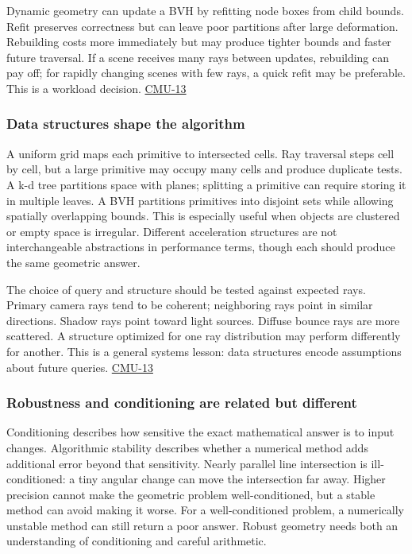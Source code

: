 Dynamic geometry can update a BVH by refitting node boxes from child bounds. Refit preserves correctness but can leave poor partitions after large deformation. Rebuilding costs more immediately but may produce tighter bounds and faster future traversal. If a scene receives many rays between updates, rebuilding can pay off; for rapidly changing scenes with few rays, a quick refit may be preferable. This is a workload decision. \hyperref[04-visual-computing-ii-ch036]{CMU-13}

\subsubsection{Data structures shape the algorithm}\label{data-structures-shape-the-algorithm}

A uniform grid maps each primitive to intersected cells. Ray traversal steps cell by cell, but a large primitive may occupy many cells and produce duplicate tests. A k-d tree partitions space with planes; splitting a primitive can require storing it in multiple leaves. A BVH partitions primitives into disjoint sets while allowing spatially overlapping bounds. This is especially useful when objects are clustered or empty space is irregular. Different acceleration structures are not interchangeable abstractions in performance terms, though each should produce the same geometric answer.

The choice of query and structure should be tested against expected rays. Primary camera rays tend to be coherent; neighboring rays point in similar directions. Shadow rays point toward light sources. Diffuse bounce rays are more scattered. A structure optimized for one ray distribution may perform differently for another. This is a general systems lesson: data structures encode assumptions about future queries. \hyperref[04-visual-computing-ii-ch036]{CMU-13}

\subsubsection{Robustness and conditioning are related but different}\label{robustness-and-conditioning-are-related-but-different}

Conditioning describes how sensitive the exact mathematical answer is to input changes. Algorithmic stability describes whether a numerical method adds additional error beyond that sensitivity. Nearly parallel line intersection is ill-conditioned: a tiny angular change can move the intersection far away. Higher precision cannot make the geometric problem well-conditioned, but a stable method can avoid making it worse. For a well-conditioned problem, a numerically unstable method can still return a poor answer. Robust geometry needs both an understanding of conditioning and careful arithmetic.

